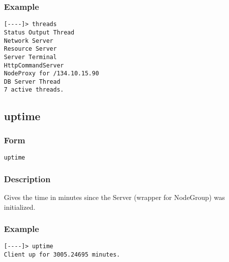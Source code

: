 \documentclass[12pt]{article}
\begin{document}
\subsubsection{Example}
\begin{verbatim}
[----]> threads
Status Output Thread
Network Server
Resource Server
Server Terminal
HttpCommandServer
NodeProxy for /134.10.15.90
DB Server Thread
7 active threads.
\end{verbatim}

\subsection{uptime}
\subsubsection{Form}
\begin{verbatim}
uptime
\end{verbatim}
\subsubsection{Description}
Gives the time in minutes since the Server (wrapper for NodeGroup) was initialized.
\subsubsection{Example}
\begin{verbatim}
[----]> uptime
Client up for 3005.24695 minutes.
\end{verbatim}
\end{document}
